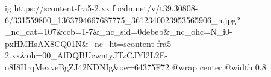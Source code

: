  
 
 
 
 

\ifcmt
  ig https://scontent-fra5-2.xx.fbcdn.net/v/t39.30808-6/331559800_1363794667687775_3612340023953565906_n.jpg?_nc_cat=107&ccb=1-7&_nc_sid=0debeb&_nc_ohc=N_i0-pxHMHsAX8CQ01N&_nc_ht=scontent-fra5-2.xx&oh=00_AfDQBUcwntyJTzCJYl2L2E-o8I8HrqMexveBgZJ42NDNIg&oe=64375F72
  @wrap center
  @width 0.8
\fi
